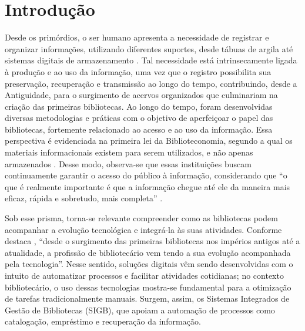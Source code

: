 %

\chapter{Introdução}
\label{cap:introducao}

Desde os primórdios, o ser humano apresenta a necessidade de registrar e organizar informações, utilizando diferentes suportes, desde tábuas de argila até sistemas digitais de armazenamento \cite{santos2012}. Tal necessidade está intrinsecamente ligada à produção e ao uso da informação, uma vez que o registro possibilita sua preservação, recuperação e transmissão ao longo do tempo, contribuindo, desde a Antiguidade, para o surgimento de acervos organizados que culminariam na criação das primeiras bibliotecas. Ao longo do tempo, foram desenvolvidas diversas metodologias e práticas com o objetivo de aperfeiçoar o papel das bibliotecas, fortemente relacionado ao acesso e ao uso da informação. Essa perspectiva é evidenciada na primeira lei da Biblioteconomia, segundo a qual os materiais informacionais existem para serem utilizados, e não apenas armazenados \cite{ranganathan1931}. Desse modo, observa-se que essas instituições buscam continuamente garantir o acesso do público à informação, considerando que ``o que é realmente importante é que a informação chegue até ele da maneira mais eficaz, rápida e sobretudo, mais completa'' \cite{baganha2004}.

Sob esse prisma, torna-se relevante compreender como as bibliotecas podem acompanhar a evolução tecnológica e integrá-la às suas atividades. Conforme destaca , ``desde o surgimento das primeiras bibliotecas nos impérios antigos até a atualidade, a profissão de bibliotecário vem tendo a sua evolução acompanhada pela tecnologia''. Nesse sentido, soluções digitais vêm sendo desenvolvidas com o intuito de automatizar processos e facilitar atividades cotidianas; no contexto bibliotecário, o uso dessas tecnologias mostra-se fundamental para a otimização de tarefas tradicionalmente manuais. Surgem, assim, os Sistemas Integrados de Gestão de Bibliotecas (SIGB), que apoiam a automação de processos como catalogação, empréstimo e recuperação da informação.

